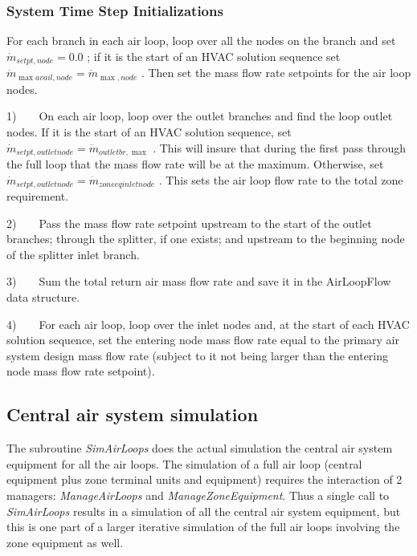 \subsubsection{System Time Step Initializations}\label{system-time-step-initializations}

For each branch in each air loop, loop over all the nodes on the branch and set \({\dot m_{setpt,node}} = 0.0\) ; if it is the start of an HVAC solution sequence set \({\dot m_{\max avail,node}} = {\dot m_{\max ,node}}\) . Then set the mass flow rate setpoints for the air loop nodes.

1)~~~~On each air loop, loop over the outlet branches and find the loop outlet nodes. If it is the start of an HVAC solution sequence, set \({\dot m_{setpt,outletnode}} = {\dot m_{outletbr,\max }}\) . This will insure that during the first pass through the full loop that the mass flow rate will be at the maximum. Otherwise, set \({\dot m_{setpt,outletnode}} = {\dot m_{zone{\mathrm{ }}eq{\mathrm{ }}inletnode}}\) . This sets the air loop flow rate to the total zone requirement.

2)~~~~Pass the mass flow rate setpoint upstream to the start of the outlet branches; through the splitter, if one exists; and upstream to the beginning node of the splitter inlet branch.

3)~~~~Sum the total return air mass flow rate and save it in the AirLoopFlow data structure.

4)~~~~For each air loop, loop over the inlet nodes and, at the start of each HVAC solution sequence, set the entering node mass flow rate equal to the primary air system design mass flow rate (subject to it not being larger than the entering node mass flow rate setpoint).

\subsection{Central air system simulation}\label{central-air-system-simulation}

The subroutine \emph{SimAirLoops} does the actual simulation the central air system equipment for all the air loops. The simulation of a full air loop (central equipment plus zone terminal units and equipment) requires the interaction of 2 managers: \emph{ManageAirLoops} and \emph{ManageZoneEquipment}. Thus a single call to \emph{SimAirLoops} results in a simulation of all the central air system equipment, but this is one part of a larger iterative simulation of the full air loops involving the zone equipment as well.

